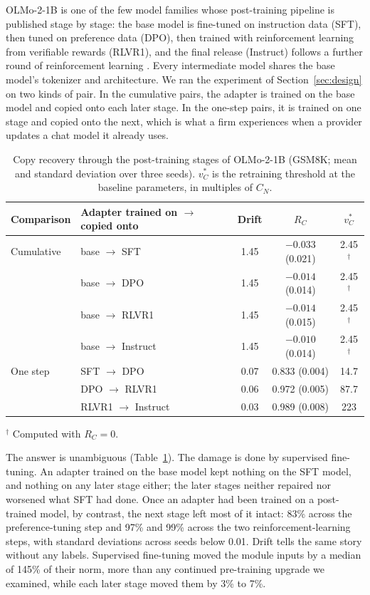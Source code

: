 \documentclass[ijds,blindrev]{informs4}
\begin{document}
OLMo-2-1B is one of the few model families whose post-training pipeline is published stage by stage: the base model is fine-tuned on instruction data (SFT), then tuned on preference data (DPO), then trained with reinforcement learning from verifiable rewards (RLVR1), and the final release (Instruct) follows a further round of reinforcement learning \citep{olmo2024olmo2}. Every intermediate model shares the base model's tokenizer and architecture. We ran the experiment of Section~\ref{sec:design} on two kinds of pair. In the cumulative pairs, the adapter is trained on the base model and copied onto each later stage. In the one-step pairs, it is trained on one stage and copied onto the next, which is what a firm experiences when a provider updates a chat model it already uses.

\begin{table}[t]
\centering
\caption{Copy recovery through the post-training stages of OLMo-2-1B (GSM8K; mean and standard deviation over three seeds). $v^*_C$ is the retraining threshold at the baseline parameters, in multiples of $C_N$.}\label{tab:stages}
\small
\begin{tabular}{llccc}
\toprule
Comparison & Adapter trained on $\to$ copied onto & Drift & $R_C$ & $v^*_C$\\
\midrule
Cumulative & base $\to$ SFT & 1.45 & $-0.033$ (0.021) & 2.45$^\dagger$\\
 & base $\to$ DPO & 1.45 & $-0.014$ (0.014) & 2.45$^\dagger$\\
 & base $\to$ RLVR1 & 1.45 & $-0.014$ (0.015) & 2.45$^\dagger$\\
 & base $\to$ Instruct & 1.45 & $-0.010$ (0.014) & 2.45$^\dagger$\\
One step & SFT $\to$ DPO & 0.07 & 0.833 (0.004) & 14.7\\
 & DPO $\to$ RLVR1 & 0.06 & 0.972 (0.005) & 87.7\\
 & RLVR1 $\to$ Instruct & 0.03 & 0.989 (0.008) & 223\\
\bottomrule
\end{tabular}

\smallskip\footnotesize $^\dagger$ Computed with $R_C=0$.
\end{table}

The answer is unambiguous (Table~\ref{tab:stages}). The damage is done by supervised fine-tuning. An adapter trained on the base model kept nothing on the SFT model, and nothing on any later stage either; the later stages neither repaired nor worsened what SFT had done. Once an adapter had been trained on a post-trained model, by contrast, the next stage left most of it intact: 83\% across the preference-tuning step and 97\% and 99\% across the two reinforcement-learning steps, with standard deviations across seeds below 0.01. Drift tells the same story without any labels. Supervised fine-tuning moved the module inputs by a median of 145\% of their norm, more than any continued pre-training upgrade we examined, while each later stage moved them by 3\% to 7\%.
\end{document}
